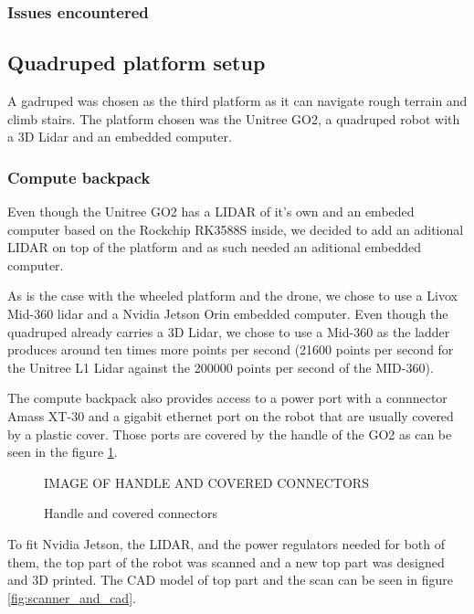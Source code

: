 \documentclass[11pt]{article}
\begin{document}
            
                \subsubsection{Issues encountered}
                
        \subsection{Quadruped platform setup}

            A gadruped was chosen as the third platform as it can navigate rough terrain and climb stairs. The platform chosen was the Unitree GO2, a quadruped robot with a 3D Lidar and an embedded computer.

            \subsubsection{Compute backpack}

            Even though the Unitree GO2 has a LIDAR of it's own and an embeded computer based on the Rockchip RK3588S inside, we decided to add an aditional LIDAR on top of the platform and as such needed an aditional embedded computer.

            As is the case with the wheeled platform and the drone, we chose to use a Livox Mid-360 lidar and a Nvidia Jetson Orin embedded computer. Even though the quadruped already carries a 3D Lidar, we chose to use a Mid-360 as the ladder produces around ten times more points per second (21600 points per second for the Unitree L1 Lidar against the 200000 points per second of the MID-360).

            The compute backpack also provides access to a power port with a connnector Amass XT-30 and a gigabit ethernet port on the robot that are usually covered by a plastic cover. Those ports are covered by the handle of the GO2 as can be seen in the figure \ref{fig:handle_cover}.  

                
            \begin{figure}[h]
                \centering
                IMAGE OF HANDLE AND COVERED CONNECTORS
                \caption{Handle and covered connectors}
                \label{fig:handle_cover}
            \end{figure}


            To fit Nvidia Jetson, the LIDAR, and the power regulators needed for both of them, the top part of the robot was scanned and a new top part was designed and 3D printed. The CAD model of top part and the scan can be seen in figure \ref{fig:scanner_and_cad}.
\end{document}
